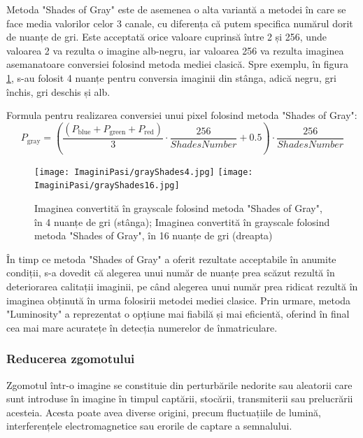 \documentclass[12pt]{article}
\begin{document}
Metoda "Shades of Gray" este de asemenea o alta variant\u{a} a metodei \^{i}n care se face media valorilor celor 3 canale, cu diferența c\u{a} putem specifica num\u{a}rul dorit de nuanțe de gri. Este acceptat\u{a} orice valoare cuprins\u{a} \^{i}ntre 2 și 256, unde valoarea 2 va rezulta o imagine alb-negru, iar valoarea 256 va rezulta imaginea asemanatoare conversiei folosind metoda mediei clasic\u{a}. Spre exemplu, \^{i}n figura \ref{fig:conversie_grayscale_custom_shades}, s-au folosit 4 nuanțe pentru conversia imaginii din st\^{a}nga, adic\u{a} negru, gri \^{i}nchis, gri deschis și alb.

Formula pentru realizarea conversiei unui pixel folosind metoda "Shades of Gray":
\begin{equation}
    P_{\mathrm{gray}}=(\frac{(P_\mathrm{blue}+P_{\mathrm{green}}+P_{\mathrm{red}})}{3} \cdot \frac{256}{ShadesNumber}+0.5)\cdot \frac{256}{ShadesNumber}
\end{equation}

\begin{figure}[H]
  \centering
  \texttt{[image: ImaginiPasi/grayShades4.jpg]}\hfill
  \texttt{[image: ImaginiPasi/grayShades16.jpg]}
  \caption{Imaginea convertit\u{a} \^{i}n grayscale folosind metoda "Shades of Gray", \^{i}n 4 nuanțe de gri (st\^{a}nga); Imaginea convertit\u{a} \^{i}n grayscale folosind metoda "Shades of Gray", \^{i}n 16 nuanțe de gri (dreapta)}
  \label{fig:conversie_grayscale_custom_shades}
\end{figure}

\^{I}n timp ce metoda "Shades of Gray" a oferit rezultate acceptabile \^{i}n anumite condiții, s-a dovedit c\u{a} alegerea unui num\u{a}r de nuanțe prea sc\u{a}zut rezult\u{a} \^{i}n deteriorarea calitații imaginii, pe c\^{a}nd alegerea unui num\u{a}r prea ridicat rezult\u{a} \^{i}n imaginea obținut\u{a} \^{i}n urma folosirii metodei mediei clasice. Prin urmare, metoda "Luminosity" a reprezentat o opțiune mai fiabil\u{a} și mai eficient\u{a}, oferind \^{i}n final cea mai mare acuratețe \^{i}n detecția numerelor de \^{i}nmatriculare.

\subsubsection{Reducerea zgomotului}

Zgomotul \^{i}ntr-o imagine se constituie din perturb\u{a}rile nedorite sau aleatorii care sunt introduse \^{i}n imagine \^{i}n timpul capt\u{a}rii, stoc\u{a}rii, transmiterii sau prelucr\u{a}rii acesteia. Acesta poate avea diverse origini, precum fluctuațiile de lumin\u{a}, interferențele electromagnetice sau erorile de captare a semnalului.
\end{document}
